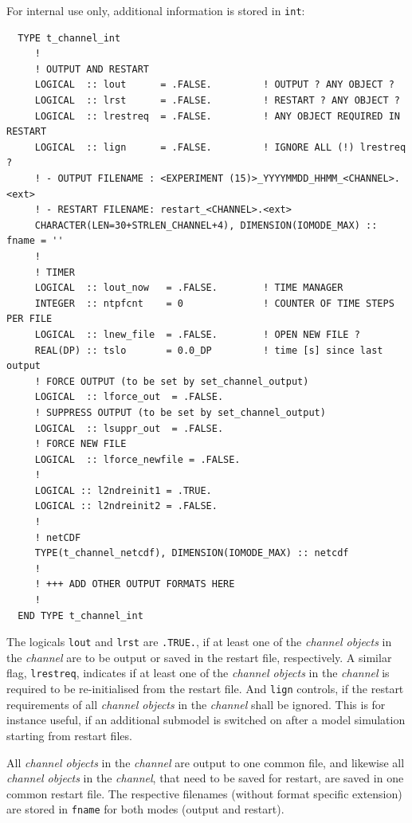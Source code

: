 \documentclass[twoside]{article}
\begin{document}
For internal use only, additional information is stored in {\tt int}:
%
\begin{verbatim}
  TYPE t_channel_int
     !
     ! OUTPUT AND RESTART
     LOGICAL  :: lout      = .FALSE.         ! OUTPUT ? ANY OBJECT ?
     LOGICAL  :: lrst      = .FALSE.         ! RESTART ? ANY OBJECT ?
     LOGICAL  :: lrestreq  = .FALSE.         ! ANY OBJECT REQUIRED IN RESTART
     LOGICAL  :: lign      = .FALSE.         ! IGNORE ALL (!) lrestreq ?
     ! - OUTPUT FILENAME : <EXPERIMENT (15)>_YYYYMMDD_HHMM_<CHANNEL>.<ext>
     ! - RESTART FILENAME: restart_<CHANNEL>.<ext>
     CHARACTER(LEN=30+STRLEN_CHANNEL+4), DIMENSION(IOMODE_MAX) :: fname = ''
     !
     ! TIMER
     LOGICAL  :: lout_now   = .FALSE.        ! TIME MANAGER
     INTEGER  :: ntpfcnt    = 0              ! COUNTER OF TIME STEPS PER FILE
     LOGICAL  :: lnew_file  = .FALSE.        ! OPEN NEW FILE ?
     REAL(DP) :: tslo       = 0.0_DP         ! time [s] since last output
     ! FORCE OUTPUT (to be set by set_channel_output)
     LOGICAL  :: lforce_out  = .FALSE.
     ! SUPPRESS OUTPUT (to be set by set_channel_output)
     LOGICAL  :: lsuppr_out  = .FALSE.
     ! FORCE NEW FILE
     LOGICAL  :: lforce_newfile = .FALSE.
     !
     LOGICAL :: l2ndreinit1 = .TRUE.
     LOGICAL :: l2ndreinit2 = .FALSE.
     !
     ! netCDF
     TYPE(t_channel_netcdf), DIMENSION(IOMODE_MAX) :: netcdf
     !
     ! +++ ADD OTHER OUTPUT FORMATS HERE
     !
  END TYPE t_channel_int
\end{verbatim}
%
The logicals {\tt lout} and {\tt lrst} are {\tt .TRUE.}, if at least one of the
{\it channel objects} in the {\it channel} are to be output or
saved in the restart file, respectively.
A similar flag, {\tt lrestreq}, indicates if at least one of the
{\it channel objects} in the {\it channel} is required to be re-initialised
from the restart file. And {\tt lign} controls, if the
restart requirements of all {\it channel objects} in the {\it channel}
shall be ignored. This is for instance useful, if an additional submodel
is switched on after a model simulation starting from restart files.

All {\it channel objects} in the {\it channel} are output to one common file,
and likewise all {\it channel objects} in the {\it channel},
that need to be saved for restart,
are saved in one common restart file. The respective filenames
(without format specific extension) are stored in {\tt fname} for both
modes (output and restart).
\end{document}
